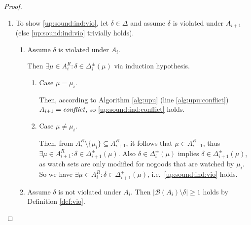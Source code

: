 \documentclass{vutinfth} %
\newcommand{\bass}{\mathcal{B}}
\newcommand{\ass}{A}
\newcommand{\bT}{\mathbf{T}}
\newcommand{\bF}{\mathbf{F}}
\newcommand{\dpm}{\Delta^\pm}
\newcommand{\headf}{\mathrm{head}}
\newcommand{\bodyf}{\mathrm{body}}
\newcommand{\sgl}{\mu}
\newcommand{\bsgl}{\sigma}
\begin{document}
\begin{proof}
\begin{enumerate}
\begin{enumerate}
\end{enumerate}

\item To show \ref{up:sound:ind:vio}, let $\delta \in \Delta$ and assume $\delta$ is violated under $A_{i+1}$ (else \ref{up:sound:ind:vio} trivially holds).
\begin{enumerate}
\item Assume $\delta$ is violated under $A_i$.

Then $\exists \sgl \in \ass_i^R : \delta \in \dpm_i(\sgl)$ via induction hypothesis.
\begin{enumerate}
\item Case $\sgl = \sgl_i$.

Then, according to Algorithm \ref{alg:upu} (line \ref{alg:upu:conflict}) $A_{i+1} = \emph{conflict}$, so \ref{up:sound:ind:conflict} holds.

\item Case $\sgl \not = \sgl_i$.

Then, from $\ass_{i}^R \setminus \{ \sgl_i \} \subseteq \ass_{i+1}^R$, it follows that $\sgl \in \ass_{i+1}^R$, thus $\exists \sgl \in \ass_{i+1}^R : \delta \in \dpm_{i+1}(\sgl)$. Also $\delta \in \dpm_i(\sgl)$ implies $\delta \in \dpm_{i+1}(\sgl)$, as watch sets are only modified for nogoods that are watched by $\sgl_i$. So we have $\exists \sgl \in \ass_i^R : \delta \in \dpm_{i+1}(\sgl)$, i.e.~\ref{up:sound:ind:vio} holds.
\end{enumerate}
\item Assume $\delta$ is not violated under $A_i$. Then $|\bass(A_i) \setminus \delta| \geq 1$  holds by Definition \ref{def:vio}.


\end{enumerate}
\end{enumerate}
\end{proof}
\end{document}
